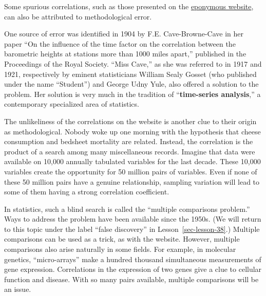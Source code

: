 \documentclass[
  letterpaper,
  DIV=11,
  numbers=noendperiod,
  oneside]{scrreprt}
\begin{document}
\begin{tcolorbox}[enhanced jigsaw, colbacktitle=quarto-callout-note-color!10!white, breakable, opacitybacktitle=0.6, colback=white, left=2mm, arc=.35mm, colframe=quarto-callout-note-color-frame, coltitle=black, toprule=.15mm, opacityback=0, leftrule=.75mm, bottomtitle=1mm, toptitle=1mm, titlerule=0mm, title=\textcolor{quarto-callout-note-color}{\faInfo}\hspace{0.5em}{Time series analysis}, rightrule=.15mm, bottomrule=.15mm]

Some spurious correlations, such as those presented on the
\href{http://www.tylervigen.com/spurious-correlations}{eponymous
website}, can also be attributed to methodological error.

One source of error was identified in 1904 by F.E. Cave-Browne-Cave in
her paper ``On the influence of the time factor on the correlation
between the barometric heights at stations more than 1000 miles apart,''
published in the Proceedings of the Royal Society. ``Miss Cave,'' as she
was referred to in 1917 and 1921, respectively by eminent statisticians
William Sealy Gosset (who published under the name ``Student'') and
George Udny Yule, also offered a solution to the problem. Her solution
is very much in the tradition of ``\textbf{time-series analysis},'' a
contemporary specialized area of statistics.

The unlikeliness of the correlations on the website is another clue to
their origin as methodological. Nobody woke up one morning with the
hypothesis that cheese consumption and bedsheet mortality are related.
Instead, the correlation is the product of a search among many
miscellaneous records. Imagine that data were available on 10,000
annually tabulated variables for the last decade. These 10,000 variables
create the opportunity for 50 million pairs of variables. Even if none
of these 50 million pairs have a genuine relationship, sampling
variation will lead to some of them having a strong correlation
coefficient.

In statistics, such a blind search is called the ``multiple comparisons
problem.'' Ways to address the problem have been available since the
1950s. (We will return to this topic under the label ``false discovery''
in Lesson~\ref{sec-lesson-38}.) Multiple comparisons can be used as a
trick, as with the website. However, multiple comparisons also arise
naturally in some fields. For example, in molecular genetics,
``micro-arrays'' make a hundred thousand simultaneous measurements of
gene expression. Correlations in the expression of two genes give a clue
to cellular function and disease. With so many pairs available, multiple
comparisons will be an issue.

\end{tcolorbox}
\end{document}
